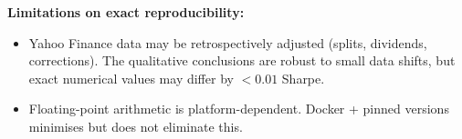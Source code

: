 \documentclass[conference]{IEEEtran}
\begin{document}
\textbf{Limitations on exact reproducibility:}
\begin{itemize}
    \item Yahoo Finance data may be retrospectively adjusted (splits,
    dividends, corrections). The qualitative conclusions are robust to
    small data shifts, but exact numerical values may differ by
    $< 0.01$ Sharpe.
    \item Floating-point arithmetic is platform-dependent. Docker + pinned
    versions minimises but does not eliminate this.
\end{itemize}
\end{document}
